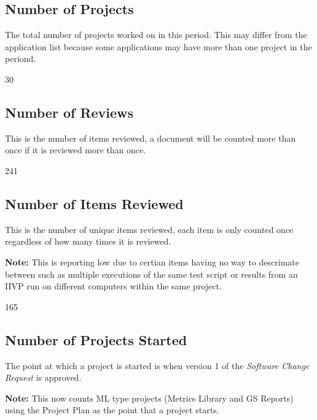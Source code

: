 \documentclass{article}
\begin{document}
\subsection{Number of Projects}
The total number of  projects worked on in this period. This may differ from the
application list because some applications may have more than one project in
the periond.

\begin{Schunk}
\begin{Soutput}
[1] 30
\end{Soutput}
\end{Schunk}

\subsection{Number of Reviews}
This is the number of items reviewed, a document will be counted more than once
if it is reviewed more than once.

\begin{Schunk}
\begin{Soutput}
[1] 241
\end{Soutput}
\end{Schunk}

\subsection{Number of Items Reviewed}
This is the number of unique items reviewed, each item is only counted once
regardless of how many times it is reviewed.

\textbf{Note:} This is reporting low due to certian items having no way to
descrimate between such as multiple executions of the same test script or
results from an IIVP run on different computers within the same project.

\begin{Schunk}
\begin{Soutput}
[1] 165
\end{Soutput}
\end{Schunk}

\subsection{Number of Projects Started}
The point at which a project is started is when version 1 of the \textit{Software
Change Request} is approved.

\textbf{Note:} This now counts ML type projects (Metrics Library and GS Reports)
using the Project Plan as the point that a project starts.
\end{document}
